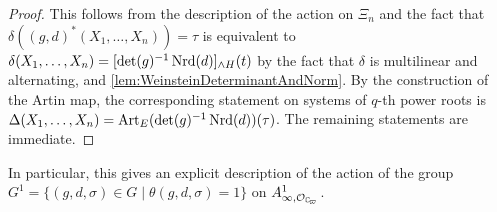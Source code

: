 \documentclass[../main.tex]{subfiles}
\begin{document}
\begin{proof}
  This follows from the description of the action on $\Xi_n$ and the fact
  that $\delta((g,d)^*\allowbreak (X_1, \dots, X_n)) = \tau$ is equivalent to 
  $\delta(X_1, \dots, X_n) = [\det(g)^{-1} \operatorname{Nrd}(d)]_{\wedge H}(t)$ by the fact
  that $\delta$ is multilinear and alternating, and
  \cref{lem:WeinsteinDeterminantAndNorm}. 
  By the construction of the Artin map, the corresponding statement on systems
  of $q$-th power roots is $\Delta(X_1, \dots, X_n) =
  \mathrm{Art}_E(\det(g)^{-1}\operatorname{Nrd}(d))(\tau)$. The remaining statements are immediate.
\end{proof}

In particular, this gives an explicit description of the action of 
the group $G^1 = \{(g,d,\sigma) \in G \mid \theta(g,d,\sigma) = 1\}$ on 
$A^1_{\infty, \cO_\Cp}$. 


\end{document}

